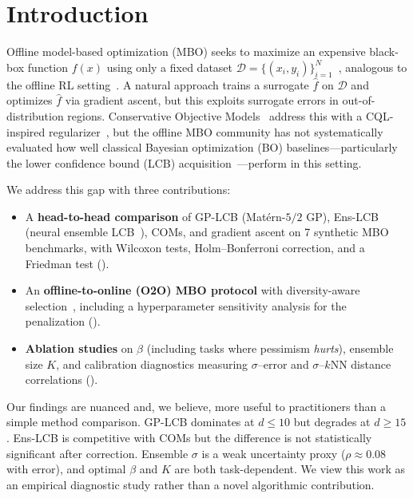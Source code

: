 \documentclass{article}
\theoremstyle{plain}
\theoremstyle{remark}
\newcommand{\method}{Ens-LCB}
\newcommand{\cD}{\mathcal{D}}
\begin{document}
\section{Introduction}
\label{sec:intro}

Offline model-based optimization (MBO) seeks to maximize an expensive black-box function $f(x)$ using only a fixed dataset $\cD = \{(x_i, y_i)\}_{i=1}^N$~\cite{trabucco2022designbench, kim2025mbosurvey}, analogous to the offline RL setting~\cite{levine2020offlinerl}.
A natural approach trains a surrogate $\hat{f}$ on $\cD$ and optimizes $\hat{f}$ via gradient ascent, but this exploits surrogate errors in out-of-distribution regions.
Conservative Objective Models~\cite[COMs;][]{trabucco2021coms} address this with a CQL-inspired regularizer~\cite{kumar2020cql}, but the offline MBO community has not systematically evaluated how well classical Bayesian optimization (BO) baselines---particularly the lower confidence bound (LCB) acquisition~\cite{srinivas2010ucb}---perform in this setting.

We address this gap with three contributions:
\begin{itemize}
    \item A \textbf{head-to-head comparison} of GP-LCB (Mat\'{e}rn-$5/2$ GP), \method{} (neural ensemble LCB~\cite{lakshminarayanan2017ensembles}), COMs, and gradient ascent on 7 synthetic MBO benchmarks, with Wilcoxon tests, Holm--Bonferroni correction, and a Friedman test ().
    \item An \textbf{offline-to-online (O2O) MBO protocol} with diversity-aware selection~\cite{gonzalez2016batch}, including a hyperparameter sensitivity analysis for the penalization ().
    \item \textbf{Ablation studies} on $\beta$ (including tasks where pessimism \emph{hurts}), ensemble size $K$, and calibration diagnostics measuring $\sigma$--error and $\sigma$--$k$NN distance correlations ().
\end{itemize}

Our findings are nuanced and, we believe, more useful to practitioners than a simple method comparison.
GP-LCB dominates at $d \leq 10$ but degrades at $d \geq 15$.
\method{} is competitive with COMs but the difference is not statistically significant after correction.
Ensemble $\sigma$ is a weak uncertainty proxy ($\rho \approx 0.08$ with error), and optimal $\beta$ and $K$ are both task-dependent.
We view this work as an empirical diagnostic study rather than a novel algorithmic contribution.
\end{document}
